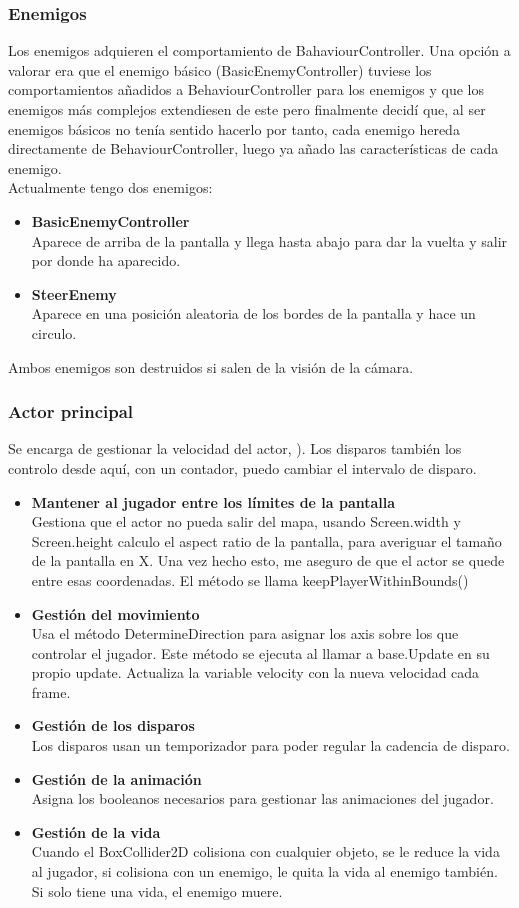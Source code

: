 \documentclass[titlepage, 4apaper]{article}
\begin{document}
\subsubsection{Enemigos}
Los enemigos adquieren el comportamiento de BahaviourController. Una opción a valorar era que el enemigo básico (BasicEnemyController) tuviese los comportamientos añadidos a BehaviourController para los enemigos y que los enemigos más complejos extendiesen de este pero finalmente decidí que, al ser enemigos básicos no tenía sentido hacerlo por tanto, cada enemigo hereda directamente de BehaviourController, luego ya añado las características de cada enemigo.\\Actualmente tengo dos enemigos:
\begin{itemize}
	\item \textbf{BasicEnemyController}\\Aparece de arriba de la pantalla y llega hasta abajo para dar la vuelta y salir por donde ha aparecido.
	\item \textbf{SteerEnemy}\\Aparece en una posición aleatoria de los bordes de la pantalla y hace un circulo.
\end{itemize}
Ambos enemigos son destruidos si salen de la visión de la cámara.
\subsubsection{Actor principal}
Se encarga de gestionar la velocidad del actor, ). Los disparos también los controlo desde aquí, con un contador, puedo cambiar el intervalo de disparo.
\begin{itemize}
	\item \textbf{Mantener al jugador entre los límites de la pantalla}\\Gestiona que el actor no pueda salir del mapa, usando Screen.width y Screen.height calculo el aspect ratio de la pantalla, para averiguar el tamaño de la pantalla en X. Una vez hecho esto, me aseguro de que el actor se quede entre esas coordenadas. El método se llama keepPlayerWithinBounds()
	\item \textbf{Gestión del movimiento}\\Usa el método DetermineDirection para asignar los axis sobre los que controlar el jugador. Este método se ejecuta al llamar a base.Update en su propio update. Actualiza la variable velocity con la nueva velocidad cada frame.
	\item \textbf{Gestión de los disparos}\\Los disparos usan un temporizador para poder regular la cadencia de disparo.
	\item \textbf{Gestión de la animación}\\Asigna los booleanos necesarios para gestionar las animaciones del jugador.
	\item \textbf{Gestión de la vida}\\Cuando el BoxCollider2D colisiona con cualquier objeto, se le reduce la vida al jugador, si colisiona con un enemigo, le quita la vida al enemigo también. Si solo tiene una vida, el enemigo muere.
\end{itemize}
\end{document}
